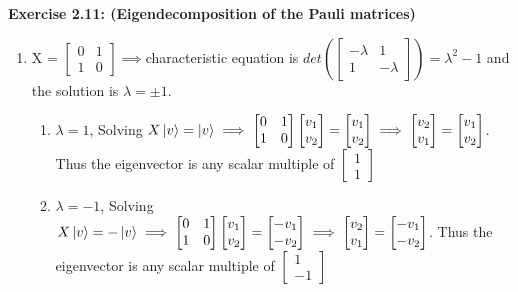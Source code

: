 \documentclass{article}
\begin{document}
\begin{framed}
    \noindent \textbf{Exercise 2.11: (Eigendecomposition of the Pauli matrices)}
    
    \medskip
    \begin{enumerate}
        \item X = $\begin{bmatrix} 0 & 1 \\ 1 & 0 \end{bmatrix} \implies $characteristic equation is $det(\begin{bmatrix} - \lambda & 1 \\ 1 & -\lambda \end{bmatrix}) = \lambda^2 - 1$ and the solution is $\lambda = \pm1$.
        \begin{enumerate}
            \item $\lambda = 1$, Solving $X\ket{v} = \ket{v} \implies \begin{bmatrix} 0 & 1 \\ 1 & 0 \end{bmatrix}\begin{bmatrix} v_1 \\ v_2 \end{bmatrix}=\begin{bmatrix} v_1 \\ v_2 \end{bmatrix} \implies \begin{bmatrix} v_2 \\ v_1 \end{bmatrix}=\begin{bmatrix} v_1 \\ v_2 \end{bmatrix}$. Thus the eigenvector is any scalar multiple of $\begin{bmatrix} 1 \\ 1 \end{bmatrix}$\\
            \item $\lambda = -1$, Solving $X\ket{v} = -\ket{v} \implies \begin{bmatrix} 0 & 1 \\ 1 & 0 \end{bmatrix}\begin{bmatrix} v_1 \\ v_2 \end{bmatrix}=\begin{bmatrix} -v_1 \\ -v_2 \end{bmatrix} \implies \begin{bmatrix} v_2 \\ v_1 \end{bmatrix} = \begin{bmatrix} -v_1 \\ -v_2 \end{bmatrix}$. Thus the eigenvector is any scalar multiple of $\begin{bmatrix} 1 \\ -1 \end{bmatrix}$

\end{enumerate}
\end{enumerate}
\end{framed}
\end{document}
